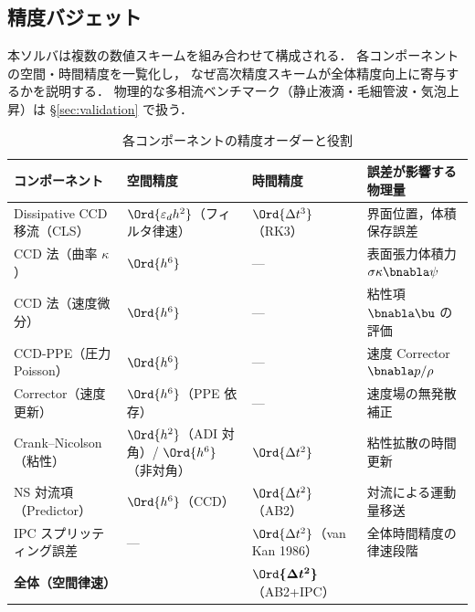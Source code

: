 %

\subsection{精度バジェット}
\label{sec:error_budget}

本ソルバは複数の数値スキームを組み合わせて構成される．
各コンポーネントの空間・時間精度を一覧化し，
なぜ高次精度スキームが全体精度向上に寄与するかを説明する．
物理的な多相流ベンチマーク（静止液滴・毛細管波・気泡上昇）は §\ref{sec:validation} で扱う．

\begin{table}[htbp]
\centering
\caption{各コンポーネントの精度オーダーと役割}
\label{tab:error_budget}
\renewcommand{\arraystretch}{1.35}
\begin{tabular}{>{\raggedright\arraybackslash}p{32mm}>{\raggedright\arraybackslash}p{28mm}>{\raggedright\arraybackslash}p{28mm}>{\raggedright\arraybackslash}p{48mm}}
\toprule
コンポーネント & 空間精度 & 時間精度 & 誤差が影響する物理量 \\
\midrule
Dissipative CCD 移流（CLS） & $\Ord{\varepsilon_d h^2}$（フィルタ律速） & $\Ord{\Delta t^3}$（RK3） & 界面位置，体積保存誤差 \\
CCD 法（曲率 $\kappa$） & $\Ord{h^6}$ & — & 表面張力体積力 $\sigma\kappa\bnabla\psi$ \\
CCD 法（速度微分） & $\Ord{h^6}$ & — & 粘性項 $\bnabla\bu$ の評価 \\
CCD-PPE（圧力 Poisson） & $\Ord{h^6}$ & — & 速度 Corrector $\bnabla p/\rho$ \\
Corrector（速度更新） & $\Ord{h^6}$（PPE 依存） & — & 速度場の無発散補正 \\
Crank--Nicolson（粘性） & $\Ord{h^2}$（ADI 対角）/ $\Ord{h^6}$（非対角） & $\Ord{\Delta t^2}$ & 粘性拡散の時間更新 \\
NS 対流項（Predictor） & $\Ord{h^6}$（CCD） & $\Ord{\Delta t^2}$（AB2） & 対流による運動量移送 \\
IPC スプリッティング誤差 & — & $\Ord{\Delta t^2}$（van Kan 1986） & 全体時間精度の律速段階 \\
\midrule
\textbf{全体（空間律速）} & \multicolumn{1}{>{\raggedright\arraybackslash}p{28mm}}{$\boldsymbol{\Ord{h^2}}$（CSF $\Ord{\varepsilon^2}$）} & $\boldsymbol{\Ord{\Delta t^2}}$（AB2+IPC） & \\
\bottomrule
\end{tabular}
\end{table}

